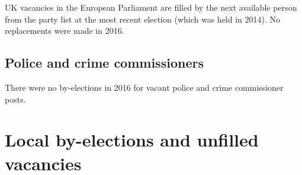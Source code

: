 \documentclass[a4paper,openany]{book}
\begin{document}
UK vacancies in the European Parliament are filled by the next available person from the party list at the most recent election (which was held in 2014). 
No replacements were made in 2016.

\section{Police and crime commissioners}

There were no by-elections in 2016 for vacant police and crime commissioner posts.

\chapter{Local by-elections and unfilled vacancies}
\end{document}
